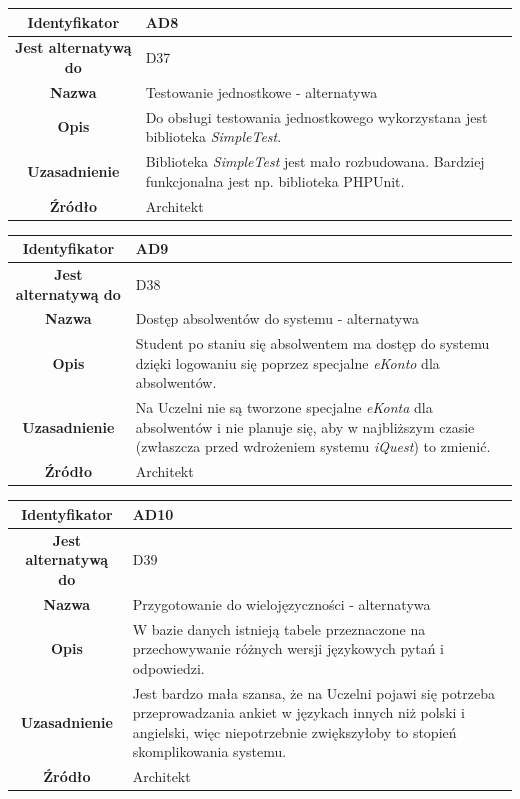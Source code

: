 \begin{table}[H]
\centering
\begin{tabular}{ | >{\bfseries}c | p{11cm} | }
\hline
%
Identyfikator & AD8 \\ \hline
Jest alternatywą do & D37 \\ \hline
Nazwa & Testowanie jednostkowe - alternatywa \\ \hline
Opis & Do obsługi testowania jednostkowego wykorzystana jest biblioteka \textit{SimpleTest}. \\ \hline
Uzasadnienie & Biblioteka \textit{SimpleTest} jest mało rozbudowana. Bardziej funkcjonalna jest np. biblioteka PHPUnit. \\ \hline
Źródło & Architekt \\ \hline
%
\end{tabular}
\end{table}

\begin{table}[H]
\centering
\begin{tabular}{ | >{\bfseries}c | p{11cm} | }
\hline
%
Identyfikator & AD9 \\ \hline
Jest alternatywą do & D38 \\ \hline
Nazwa & Dostęp absolwentów do systemu - alternatywa \\ \hline
Opis & Student po staniu się absolwentem ma dostęp do systemu dzięki logowaniu się poprzez specjalne \textit{eKonto} dla absolwentów. \\ \hline
Uzasadnienie & Na Uczelni nie są tworzone specjalne \textit{eKonta} dla absolwentów i nie planuje się, aby w najbliższym czasie (zwłaszcza przed wdrożeniem systemu \textit{iQuest}) to zmienić. \\ \hline
Źródło & Architekt \\ \hline
%
\end{tabular}
\end{table}

\begin{table}[H]
\centering
\begin{tabular}{ | >{\bfseries}c | p{11cm} | }
\hline
%
Identyfikator & AD10 \\ \hline
Jest alternatywą do & D39 \\ \hline
Nazwa & Przygotowanie do wielojęzyczności - alternatywa \\ \hline
Opis & W bazie danych istnieją tabele przeznaczone na przechowywanie różnych wersji językowych pytań i odpowiedzi. \\ \hline
Uzasadnienie & Jest bardzo mała szansa, że na Uczelni pojawi się potrzeba przeprowadzania ankiet w językach innych niż polski i angielski, więc niepotrzebnie zwiększyłoby to stopień skomplikowania systemu. \\ \hline
Źródło & Architekt \\ \hline
%
\end{tabular}
\end{table}

